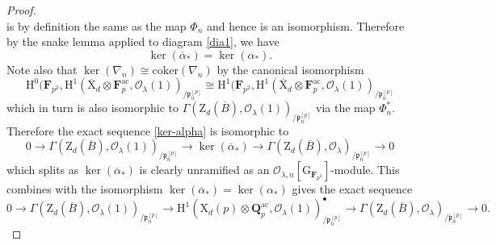 \documentclass[10pt]{amsart}
\numberwithin{equation}{section}
\theoremstyle{plain}
\numberwithin{equation}{section}
\theoremstyle{definition}
\theoremstyle{remark}
\def\coker{\mathrm{coker}}
\def\ac{\mathrm{ac}}
\def\ac{\mathrm{ac}}
\def\calO{\mathcal{O}}
\def\frakp{\mathfrak{p}}
\def\FF{\mathbf{F}}
\def\QQ{\mathbf{Q}}
\def\rmG{\mathrm{G}}
\def\rmH{\mathrm{H}}
\def\rmX{\mathrm{X}}
\def\rmZ{\mathrm{Z}}
\begin{document}
\begin{proof}
\begin{equation*}
\end{equation*}
is by definition the same as the map $\Phi_{n}$ and hence is an isomorphism.
Therefore by the snake lemma applied to diagram \ref{dia1}, we have 
\begin{equation*}
\ker(\overline{\alpha}_{\ast})=\ker(\alpha_{\ast}).
\end{equation*} 
Note also that $ \ker(\nabla_{n})\cong \coker(\nabla_{n})$ by the canonical isomorphism 
\begin{equation*}
\rmH^{0}(\FF_{p^{2}}, \rmH^{1}(\overline{\rmX}_{d}\otimes{\FF^{\ac}_{p}}, \calO_{\lambda}(1))_{/\frakp^{[p]}_{n}}\cong \rmH^{1}(\FF_{p^{2}}, \rmH^{1}(\overline{\rmX}_{d}\otimes{\FF^{\ac}_{p}}, \calO_{\lambda}(1))_{/\frakp^{[p]}_{n}}
\end{equation*}
which in turn is also isomorphic to $\Gamma(\rmZ_{d}(\overline{B}), \calO_{\lambda}(1))_{/\frakp^{[p]}_{n}}$ via the map $\Phi^{\ast}_{n}$.
Therefore the exact sequence \ref{ker-alpha} is isomorphic to
 \begin{equation*}
0\rightarrow \Gamma(\rmZ_{d}(\overline{B}), \calO_{\lambda}(1))_{/\frakp^{[p]}_{n}}\rightarrow \ker(\overline{\alpha}_{\ast})\rightarrow \Gamma(\rmZ_{d}(\overline{B}), \calO_{\lambda})_{/\frakp^{[p]}_{n}}\rightarrow0
\end{equation*}
which splits as $\ker(\overline{\alpha}_{\ast})$ is clearly unramified as an $\calO_{\lambda, n}[\rmG_{\FF_{p^{2}}}]$-module. This combines with the isomorphism $\ker(\overline{\alpha}_{\ast})=\ker(\alpha_{\ast})$ gives the exact sequence
\begin{equation*}
0\rightarrow \Gamma(\rmZ_{d}(\overline{B}), \calO_{\lambda}(1))_{/\frakp^{[p]}_{n}}\rightarrow \rmH^{1}({\rmX}_{d}(p)\otimes {\QQ^{\ac}_{p}}, \calO_{\lambda}(1))^{\bullet}_{/\frakp^{[p]}_{n}}\rightarrow \Gamma(\rmZ_{d}(\overline{B}), \calO_{\lambda})_{/\frakp^{[p]}_{n}}\rightarrow0.
\end{equation*}


\end{proof}
\end{document}
